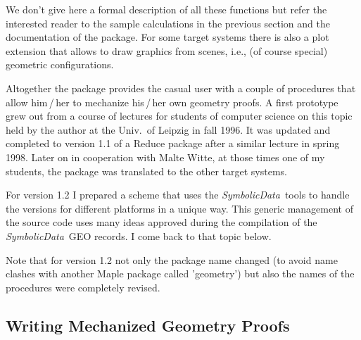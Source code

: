 \documentclass[11pt]{article}
\newcommand{\SD}{{\it Symbo\-lic\-Data}}
\begin{document}
We don't give here a formal description of all these functions
but refer the interested reader to the sample calculations in the
previous section and the documentation \cite{GeoProver} of the
package.  For some target systems there is also a plot extension
that allows to draw graphics from scenes, i.e., (of course
special) geometric configurations.

Altogether the package provides the casual user with a couple of
procedures that allow him\,/\,her to mechanize his\,/\,her own
geometry proofs. A first prototype grew out from a course of
lectures for students of computer science on this topic held by
the author at the Univ.\ of Leipzig in fall 1996. It was updated
and completed to version 1.1 of a Reduce package after a similar
lecture in spring 1998.  Later on in cooperation with Malte
Witte, at those times one of my students, the package was
translated to the other target systems.

For version 1.2 I prepared a scheme that uses the \SD\ tools to
handle the versions for different platforms in a unique way. This
generic management of the source code uses many ideas approved
during the compilation of the \SD\ GEO records.  I come back to
that topic below. 

Note that for version 1.2 not only the package name changed (to
avoid name clashes with another Maple package called 'geometry')
but also the names of the procedures were completely revised.

\subsection{Writing Mechanized Geometry Proofs}
\end{document}
